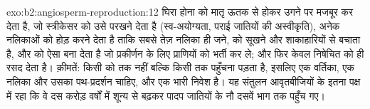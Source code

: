 \begin{solution}{exo:b2:angiosperm-reproduction:12}
घिरा होना  को मातृ ऊतक से होकर उगने पर मजबूर कर देता है, जो
स्त्रीकेसर को उसे परखने देता है (स्व-अयोग्यता, पराई जातियों की
अस्वीकृति), अनेक नलिकाओं को होड़ करने देता है ताकि सबसे तेज़ नलिका ही
 जने,  को सूखने और शाकाहारियों से बचाता है, और
 को ऐसा  बना देता है जो प्रकीर्णन के लिए प्राणियों को भर्ती कर
ले; और फिर  केवल निषेचित  को ही रसद देता है। क़ीमतें:
किसी  को  तक नहीं बल्कि किसी  तक पहुँचना पड़ता
है, इसलिए एक वर्तिका, एक नलिका और उसका पथ-प्रदर्शन चाहिए, और  एक भारी
निवेश है। यह संतुलन आवृतबीजियों के इतना पक्ष में रहा कि वे दस करोड़
वर्षों में शून्य से बढ़कर पादप जातियों के नौ दसवें भाग तक पहुँच गए।
\end{solution}

